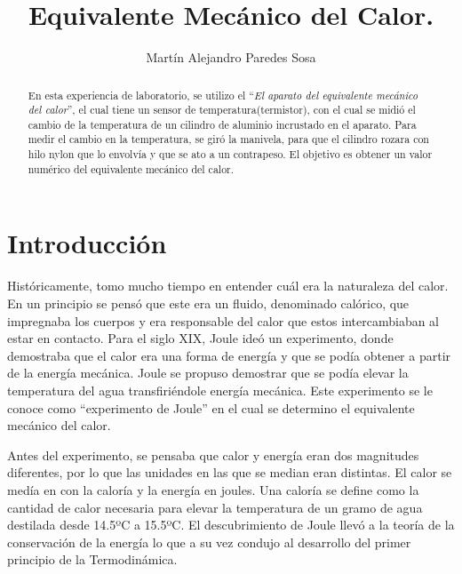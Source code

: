 \documentclass[12pt]{article}
\title{Equivalente Mecánico del Calor.}
\author{Martín Alejandro Paredes Sosa}
\makeatletter
\let\thetitle\@title
\let\theauthor\@author
\makeatother
\begin{document}
\begin{center}
{ \large \bfseries \thetitle}
\end{center}
	\begin{minipage}{\textwidth}
		\begin{center} 
			\theauthor 
		\end{center}
\end{minipage}
\begin{abstract}
	En esta experiencia de laboratorio, se utilizo el ``\textit{El aparato del equivalente mecánico del calor}'', el cual tiene un sensor de temperatura(termistor), con el cual se midió el cambio de la temperatura de un cilindro de aluminio incrustado en el aparato. Para medir el cambio en la temperatura, se giró la manivela, para que el cilindro rozara con hilo nylon que lo envolvía y que se ato a un contrapeso. El objetivo es obtener un valor numérico del equivalente mecánico del calor.

\end{abstract}
\vspace{-1cm}
\section{Introducción}
\vspace{-0.5cm}
Históricamente, tomo mucho tiempo en entender cuál era la naturaleza del calor. En un principio se pensó que este era un fluido, denominado calórico, que impregnaba los cuerpos y era responsable del calor que estos intercambiaban al estar en contacto. Para el siglo XIX, Joule ideó un experimento, donde demostraba que el calor era una forma de energía y que se podía obtener a partir de la energía mecánica. Joule se propuso demostrar que se podía elevar la temperatura del agua transfiriéndole energía mecánica. Este experimento se le conoce como ``experimento de Joule'' en el cual se determino el equivalente mecánico del calor.

\hspace{0.5cm}Antes del experimento, se pensaba que calor y energía eran dos magnitudes diferentes, por lo que las unidades en las que se median eran distintas. El calor se medía en con la caloría y la energía en joules. Una caloría se define como la cantidad de calor necesaria para elevar la temperatura de un gramo de agua destilada desde 14.5ºC a 15.5ºC. El descubrimiento de Joule llevó a la teoría de la conservación de la energía lo que a su vez condujo al desarrollo del primer principio de la Termodinámica.
\end{document}
